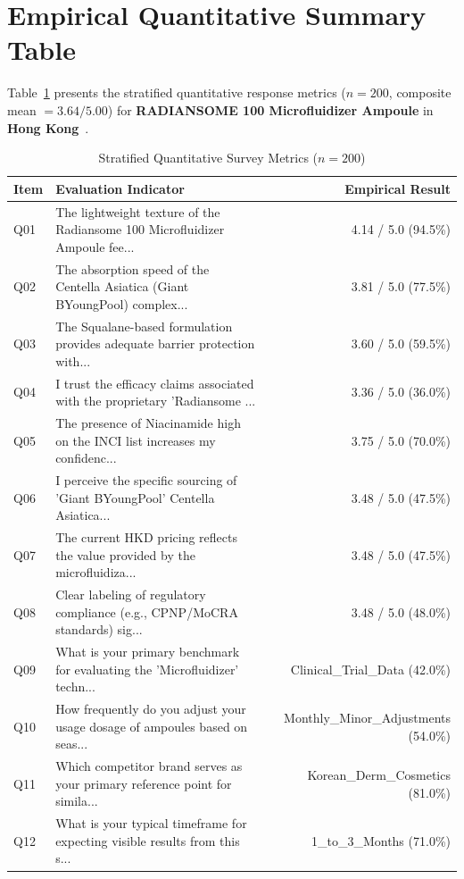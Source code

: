 \documentclass[10pt,twocolumn,a4paper]{article}
\begin{document}
\section{Empirical Quantitative Summary Table}
Table~\ref{tab:metrics} presents the stratified quantitative response metrics ($n = 200$, composite mean $= 3.64/5.00$) for \textbf{RADIANSOME 100 Microfluidizer Ampoule} in \textbf{Hong Kong}~\cite{ref_kaggle_doi,ref_hf_doi}.

\begin{table}[t]
\centering
\caption{Stratified Quantitative Survey Metrics ($n = 200$)}
\label{tab:metrics}
\small
\begin{tabularx}{\textwidth}{l X r}
\toprule
\textbf{Item} & \textbf{Evaluation Indicator} & \textbf{Empirical Result} \\
\midrule
Q01 & The lightweight texture of the Radiansome 100 Microfluidizer Ampoule fee... & 4.14 / 5.0 (94.5\%) \\
Q02 & The absorption speed of the Centella Asiatica (Giant BYoungPool) complex... & 3.81 / 5.0 (77.5\%) \\
Q03 & The Squalane-based formulation provides adequate barrier protection with... & 3.60 / 5.0 (59.5\%) \\
Q04 & I trust the efficacy claims associated with the proprietary 'Radiansome ... & 3.36 / 5.0 (36.0\%) \\
Q05 & The presence of Niacinamide high on the INCI list increases my confidenc... & 3.75 / 5.0 (70.0\%) \\
Q06 & I perceive the specific sourcing of 'Giant BYoungPool' Centella Asiatica... & 3.48 / 5.0 (47.5\%) \\
Q07 & The current HKD pricing reflects the value provided by the microfluidiza... & 3.48 / 5.0 (47.5\%) \\
Q08 & Clear labeling of regulatory compliance (e.g., CPNP/MoCRA standards) sig... & 3.48 / 5.0 (48.0\%) \\
Q09 & What is your primary benchmark for evaluating the 'Microfluidizer' techn... & Clinical\_Trial\_Data (42.0\%) \\
Q10 & How frequently do you adjust your usage dosage of ampoules based on seas... & Monthly\_Minor\_Adjustments (54.0\%) \\
Q11 & Which competitor brand serves as your primary reference point for simila... & Korean\_Derm\_Cosmetics (81.0\%) \\
Q12 & What is your typical timeframe for expecting visible results from this s... & 1\_to\_3\_Months (71.0\%) \\

\end{tabularx}
\end{table}
\end{document}
